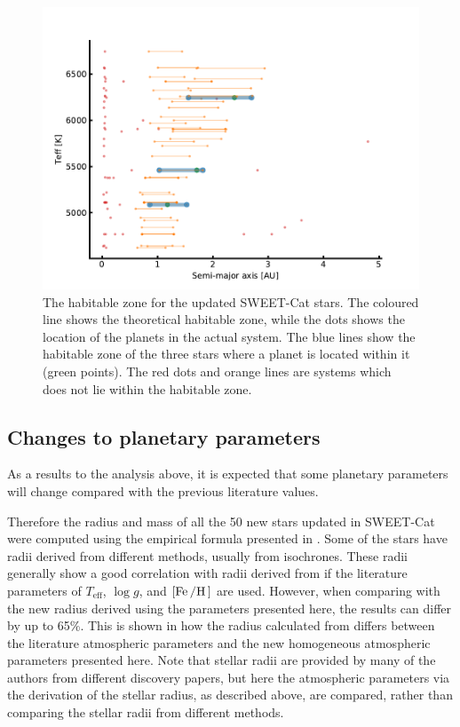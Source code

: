 \begin{figure}[htpb!]
    \centering
    \includegraphics[width=0.8\linewidth]{figures/HZ.pdf}
    \caption{The habitable zone for the updated SWEET-Cat stars. The coloured line shows the
             theoretical habitable zone, while the dots shows the location of the planets in the
             actual system. The blue lines show the habitable zone of the three stars where a planet
             is located within it (green points). The red dots and orange lines are systems which
             does not lie within the habitable zone.}
    \label{fig:HZ}
\end{figure}



\subsection{Changes to planetary parameters}

As a results to the analysis above, it is expected that some planetary parameters will change
compared with the previous literature values.

Therefore the radius and mass of all the 50 new stars updated in SWEET-Cat were computed using the
empirical formula presented in \citet{Torres2010}. Some of the stars have radii derived from
different methods, usually from isochrones. These radii generally show a good correlation with radii
derived from \citet{Torres2010} if the literature parameters of $T_\mathrm{eff}$, $\log g$, and
$[\ion{Fe}/\ion{H}]$ are used. However, when comparing with the new radius derived using the
parameters presented here, the results can differ by up to 65\%. This is shown in  how
the radius calculated from \citet{Torres2010} differs between the literature atmospheric parameters
and the new homogeneous atmospheric parameters presented here. Note that stellar radii are provided
by many of the authors from different discovery papers, but here the atmospheric parameters via the
derivation of the stellar radius, as described above, are compared, rather than comparing the
stellar radii from different methods.

